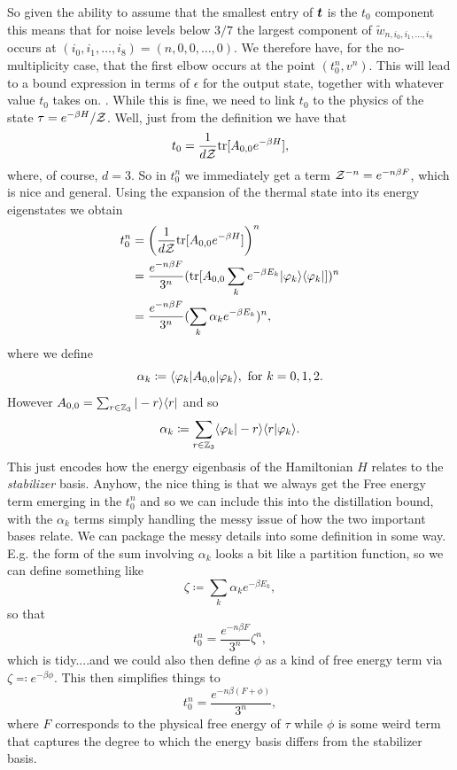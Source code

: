 \documentclass[pra,
aps,
twocolumn,
superscriptaddress,
groupedaddress,
nofootinbib,
reprint
]{revtex4-1}
\begin{document}
So given the ability to assume that the smallest entry of $\boldsymbol{t}$ is the $t_0$ component this means that for noise levels below $3/7$ the largest component of $\tilde{w}_{n,i_0, i_1, \dots, i_8}$ occurs at $(i_0,i_1, \dots, i_8) = (n,0,0,\dots ,0)$. We therefore have, for the no-multiplicity case, that the first elbow occurs at the point $(t_0^n, v^n)$. This will lead to a bound expression in terms of $\epsilon$ for the output state, together with whatever value $t_0$ takes on. . While this is fine, we need to link $t_0$ to the physics of the state $\tau = e^{-\beta H}/\mathcal{Z}$. Well, just from the definition we have that
\begin{equation}
t_0 = \frac{1}{d\mathcal{Z}}\mbox{tr} [ A_{0,0} e^{-\beta H}],
\end{equation}
where, of course, $d=3$. So in $t_0^n$ we immediately get a term $\mathcal{Z}^{-n} = e^{-n\beta F}$, which is nice and general. Using the expansion of the thermal state into its energy eigenstates we obtain
\begin{align}
t_0^n &= \left ( \frac{1}{d\mathcal{Z}}\mbox{tr} [ A_{0,0} e^{-\beta H}] \right )^n \nonumber \\
&= \frac{e^{-n\beta F}}{3^n} ( \mbox{tr} [ A_{0,0} \sum_k e^{-\beta E_k} |\varphi_k\rangle\langle\varphi_k|])^n\nonumber \\
&= \frac{e^{-n \beta F}}{3^n} ( \sum_k \alpha_k e^{-\beta E_k})^n,
\end{align}
where we define
\begin{equation}
\alpha_k \coloneqq \langle\varphi_k |A_{0,0} |\varphi_k\rangle, \mbox{ for }k=0,1,2.
\end{equation}
However $A_{0,0} = \sum_{r\in \mathbb{Z}_3} | -r\rangle\langle r|$ and so
\begin{equation}
\alpha_k \coloneqq \sum_{r \in \mathbb{Z}_3} \langle\varphi_k |-r\rangle \langle r |\varphi_k\rangle.
\end{equation}
This just encodes how the energy eigenbasis of the Hamiltonian $H$ relates to the \emph{stabilizer} basis. Anyhow, the nice thing is that we always get the Free energy term emerging in the $t_0^n$ and so we can include this into the distillation bound, with the $\alpha_k$ terms simply handling the messy issue of how the two important bases relate. We can package the messy details into some definition in some way. E.g. the form of the sum involving $\alpha_k$ looks a bit like a partition function, so we can define something like
\begin{equation}
\zeta \coloneqq  \sum_k \alpha_k e^{-\beta E_k},
\end{equation}
so that
\begin{equation}
t_0^n = \frac{e^{-n\beta F}}{3^n}\zeta^n,
\end{equation}
which is tidy....and we could also then define $\phi$ as a kind of free energy term via $\zeta \eqqcolon e^{-\beta \phi}$. This then simplifies things to
\begin{equation}
t_0^n =  \frac{e^{-n \beta (F+\phi)}}{3^n},
\end{equation}
where $F$ corresponds to the physical free energy of $\tau$ while $\phi$ is some weird term that captures the degree to which the energy basis differs from the stabilizer basis. 
\end{document}

